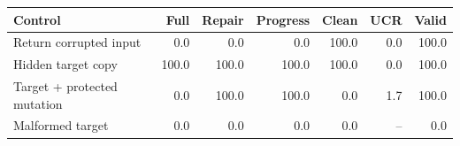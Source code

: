 \begin{tabular}{lrrrrrr}
\toprule
Control & Full & Repair & Progress & Clean & UCR & Valid \\
\midrule
Return corrupted input & 0.0 & 0.0 & 0.0 & 100.0 & 0.0 & 100.0 \\
Hidden target copy & 100.0 & 100.0 & 100.0 & 100.0 & 0.0 & 100.0 \\
Target + protected mutation & 0.0 & 100.0 & 100.0 & 0.0 & 1.7 & 100.0 \\
Malformed target & 0.0 & 0.0 & 0.0 & 0.0 & -- & 0.0 \\
\bottomrule
\end{tabular}
